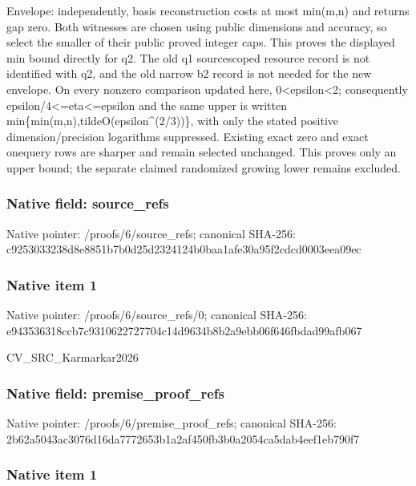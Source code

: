 \documentclass[10pt,a4paper]{article}
\begin{document}
Envelope: independently, basis reconstruction costs at most min(m,n) and returns gap zero. Both witnesses are chosen using public dimensions and accuracy, so select the smaller of their public proved integer caps. This proves the displayed min bound directly for q2. The old q1 sourcescoped resource record is not identified with q2, and the old narrow b2 record is not needed for the new envelope. On every nonzero comparison updated here, 0<epsilon<2; consequently epsilon/4<=eta<=epsilon and the same upper is written min\{min(m,n),tildeO(epsilon\textasciicircum{}(2/3))\}, with only the stated positive dimension/precision logarithms suppressed. Existing exact zero and exact onequery rows are sharper and remain selected unchanged. This proves only an upper bound; the separate claimed randomized growing lower remains excluded.


\subsubsection{Native field: source\_refs}


Native pointer: /proofs/6/source\_refs; canonical SHA-256: c9253033238d8e8851b7b0d2\allowbreak{}5d2324124b0baa1afe30a95f\allowbreak{}2cdcd0003eea09ec



\subsubsection{Native item 1}


Native pointer: /proofs/6/source\_refs/0; canonical SHA-256: e943536318ccb7c931062272\allowbreak{}7704c14d9634b8b2a9ebb06f\allowbreak{}646fbdad99afb067


CV\_SRC\_Karmarkar2026


\subsubsection{Native field: premise\_proof\_refs}


Native pointer: /proofs/6/premise\_proof\_refs; canonical SHA-256: 2b62a5043ac3076d16da7772\allowbreak{}653b1a2af450fb3b0a2054ca\allowbreak{}5dab4eef1eb790f7



\subsubsection{Native item 1}
\end{document}
